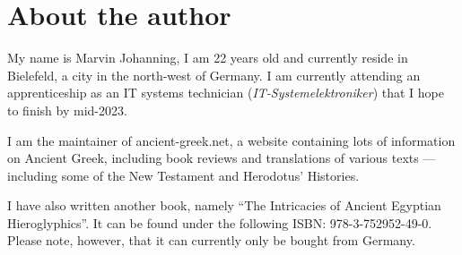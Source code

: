 \chapter*{About the author}

My name is Marvin Johanning, I am 22 years old and currently reside in Bielefeld, a city in the north-west of Germany. I am currently attending an apprenticeship as an IT systems technician (\textit{IT-Systemelektroniker}) that I hope to finish by mid-2023. 

I am the maintainer of ancient-greek.net, a website containing lots of information on Ancient Greek, including book reviews and translations of various texts — including some of the New Testament and Herodotus’ Histories. 

I have also written another book, namely “The Intricacies of Ancient Egyptian Hieroglyphics”. It can be found under the following ISBN: 978-3-752952-49-0. Please note, however, that it can currently only be bought from Germany. 